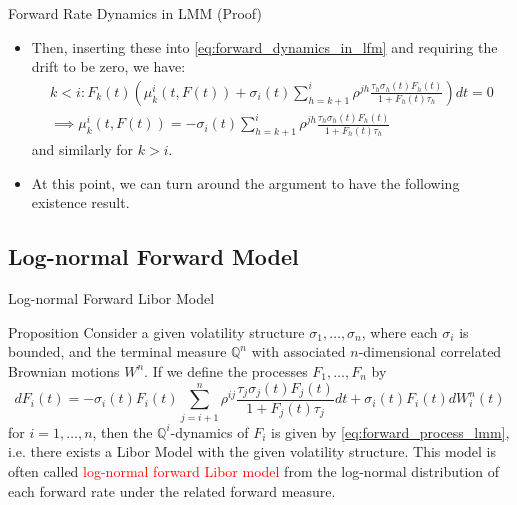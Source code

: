 \documentclass{beamer}
\begin{document}
\begin{frame}{Forward Rate Dynamics in LMM (Proof)}
	\begin{itemize}
	\item<1-> Then, inserting these into \cref{eq:forward_dynamics_in_lfm} and requiring the drift to be zero, we have:
		\begin{equation*}
			\begin{gathered}
				k < i : F_k(t)\left( \mu_k^i(t, F(t)) + \sigma_i(t)\sum_{h=k+1}^i \rho^{jh} \frac{\tau_h\sigma_h(t)F_h(t)}{1+F_h(t)\tau_h}\right) dt = 0 \\
				\implies \mu_k^i(t, F(t)) = - \sigma_i(t)\sum_{h=k+1}^i \rho^{jh} \frac{\tau_h\sigma_h(t)F_h(t)}{1+F_h(t)\tau_h}
			\end{gathered}
		\end{equation*}
		and similarly for $k > i$.
\myendproof
	\item<2-> At this point, we can turn around the argument to have the following existence result.
	\end{itemize}
\end{frame}

\subsection{Log-normal Forward Model}
\begin{frame}{Log-normal Forward Libor Model}
  \begin{block}{Proposition}
    Consider a given volatility structure $\sigma_1,\ldots, \sigma_n$, where each $\sigma_i$ is bounded, and the terminal measure $\mathbb{Q}^n$ with associated $n$-dimensional correlated Brownian motions $W^n$. If we define the processes $F_1,\ldots, F_n$ by
    \begin{equation}
      dF_i(t) = -\sigma_i(t)F_i(t)\sum_{j=i+1}^n \rho^{ij} \frac{\tau_j\sigma_j(t)F_j(t)}{1+F_j(t)\tau_j} dt + \sigma_i(t)F_i(t)dW^n_i(t)
    \end{equation}
    for $i = 1,\ldots, n$, then the $\mathbb{Q}^i$-dynamics of $F_i$ is given by \cref{eq:forward_process_lmm}, i.e. there exists a Libor Model with the given volatility structure.
  This model is often called \textcolor{red}{log-normal forward Libor model} from the log-normal distribution of each forward rate under the related forward measure.
  \end{block}
\end{frame}
\end{document}
